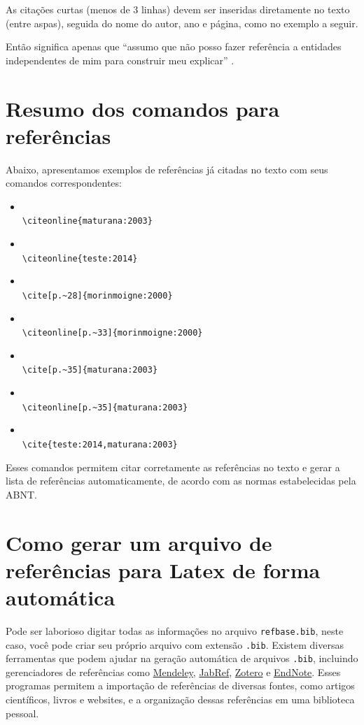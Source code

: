 As citações curtas (menos de 3 linhas) devem ser inseridas diretamente no texto (entre aspas), seguida do nome do autor, ano e página, como no exemplo a seguir.

Então significa apenas que ``assumo que não posso fazer referência a entidades independentes de mim para construir meu explicar'' \cite[p.~35]{maturana:2003}.

\section{Resumo dos comandos para  referências }\label{referenciasUtilizadas}
Abaixo, apresentamos exemplos de referências já citadas no texto com seus comandos correspondentes:
\begin{itemize}
	\item {}\\ \verb|\citeonline{maturana:2003}|
	\item {}\\ \verb|\citeonline{teste:2014}|
	\item \cite[p.~28]{morinmoigne:2000}\\ \verb|\cite[p.~28]{morinmoigne:2000}|
	\item {}\\ \verb|\citeonline[p.~33]{morinmoigne:2000}|
	\item \cite[p.~35]{maturana:2003}\\ \verb|\cite[p.~35]{maturana:2003}|
	\item {}\\ \verb|\citeonline[p.~35]{maturana:2003}|
	\item \cite{teste:2014,maturana:2003}\\ \verb|\cite{teste:2014,maturana:2003}|
\end{itemize}

Esses comandos permitem citar corretamente as referências no texto e gerar a lista de referências automaticamente, de acordo com as normas estabelecidas pela ABNT.

\section{Como gerar um arquivo de referências para Latex de forma automática}
Pode ser laborioso  digitar todas as informações no arquivo \verb|refbase.bib|, neste caso, você pode criar seu próprio arquivo com extensão \verb|.bib|. Existem diversas ferramentas que podem ajudar na geração automática de arquivos \verb|.bib|, incluindo gerenciadores de referências como \href{https://www.mendeley.com}{Mendeley}, \href{https://www.jabref.org}{JabRef}, \href{https://www.zotero.org}{Zotero} e \href{https://endnote.com}{EndNote}. Esses programas permitem a importação de referências de diversas fontes, como artigos científicos, livros e websites, e a organização dessas referências em uma biblioteca pessoal.

